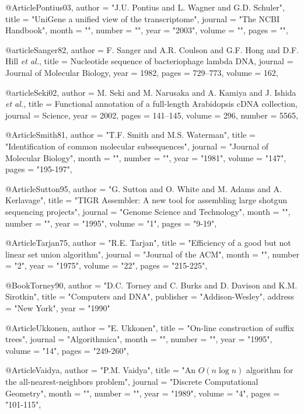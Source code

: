 @Article{Pontius03,
   author =   "J.U. Pontius and L. Wagner and G.D. Schuler",
   title =   "{UniGene} a unified view of the transcriptome",
   journal =   "The NCBI Handbook",
   month = "",
   number = "",
   year =   "2003",
   volume =   "",
   pages =   "",
}




@article{Sanger82,
author = {F. Sanger and A.R. Coulson and G.F. Hong and D.F. Hill {\it et al.}},
title = {Nucleotide sequence of bacteriophage lambda {DNA}},
journal = {Journal of Molecular Biology},
year = 1982,
pages = {729--773},
volume = {162},
}


@article{Seki02,
author = {M. Seki and M. Narusaka and A. Kamiya and J. Ishida  {\it et al.}},
title = {Functional annotation of a full-length {A}rabidopsis {cDNA} collection},
journal = {Science},
year = 2002,
pages = {141--145},
volume = {296},
number = {5565},
}



@Article{Smith81,
   author =   "T.F. Smith and M.S. Waterman",
   title =   "Identification of common molecular subsequences",
   journal =   "Journal of Molecular Biology",
   month = "",
   number = "",
   year =   "1981",
   volume =   "147",
   pages =   "195-197",
}


@Article{Sutton95,
   author =   "G. Sutton and O. White and M. Adams and A. Kerlavage",
   title =   "T\uppercase{I}\uppercase{G}\uppercase{R} Assembler: A new tool for assembling large shotgun
              sequencing projects",
   journal =   "Genome Science and Technology",
   month = "",
   number = "",
   year =   "1995",
   volume =   "1",
   pages =   "9-19",
}

@Article{Tarjan75,
   author =   "R.E. Tarjan",
   title =   "Efficiency of a good but not linear set union algorithm",
   journal =   "Journal of the \uppercase{A}\uppercase{C}\uppercase{M}",
   month = "",
   number = "2",
   year =   "1975",
   volume =   "22",
   pages =   "215-225",
}

@Book{Torney90,
   author =   "D.C. Torney and C. Burks and D. Davison and K.M. Sirotkin",
   title =   "Computers and {DNA}",
   publisher =   "Addison-Wesley",
   address = "New York",
   year =   "1990"
}

@Article{Ukkonen,
   author =   "E. Ukkonen",
   title =   "On-line construction of suffix trees",
   journal =   "Algorithmica",
   month = "",
   number = "",
   year =   "1995",
   volume =   "14",
   pages =   "249-260",
}

@Article{Vaidya,
   author =   "P.M. Vaidya",
   title =   "An $O(n\log n)$ algorithm for the all-nearest-neighbors problem",
   journal =   "Discrete Computational Geometry",
   month = "",
   number = "",
   year =   "1989",
   volume =   "4",
   pages =   "101-115",
}

